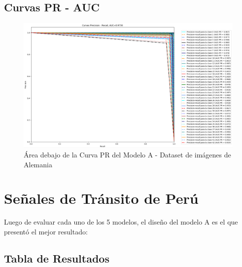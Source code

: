 		\subsection{Curvas PR - AUC}  
					\begin{figure}[H]
						\includegraphics[width=\textwidth,height=\textheight,keepaspectratio]{images/desarrollo/testResults/german/PR_curve_modelE} 
						\begin{center}
						\caption{\small{Área debajo de la Curva PR del Modelo A - Dataset de imágenes de Alemania}}
						\vspace{-1em}
						{\small{\fontsize{10}{16.8}\selectfont {Fuente propia}}}
						\end{center}
						\vspace{-1.5em}
					\end{figure}		
	
	\section{Señales de Tránsito de Perú}

		Luego de evaluar cada uno de los 5 modelos, el diseño del modelo A es el que presentó el mejor resultado:

		\subsection{Tabla de Resultados}

